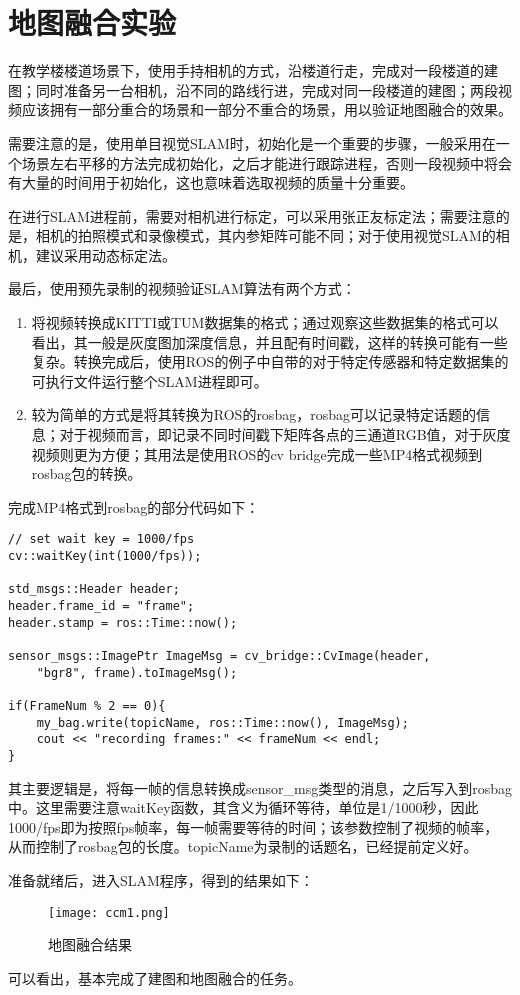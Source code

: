 \section{地图融合实验}

在教学楼楼道场景下，使用手持相机的方式，沿楼道行走，完成对一段楼道的建图；同时准备另一台相机，沿不同的路线行进，完成对同一段楼道的建图；两段视频应该拥有一部分重合的场景和一部分不重合的场景，用以验证地图融合的效果。

需要注意的是，使用单目视觉SLAM时，初始化是一个重要的步骤，一般采用在一个场景左右平移的方法完成初始化，之后才能进行跟踪进程，否则一段视频中将会有大量的时间用于初始化，这也意味着选取视频的质量十分重要。

在进行SLAM进程前，需要对相机进行标定，可以采用张正友标定法；需要注意的是，相机的拍照模式和录像模式，其内参矩阵可能不同；对于使用视觉SLAM的相机，建议采用动态标定法。

最后，使用预先录制的视频验证SLAM算法有两个方式：

\begin{enumerate}
	\item 将视频转换成KITTI或TUM数据集的格式；通过观察这些数据集的格式可以看出，其一般是灰度图加深度信息，并且配有时间戳，这样的转换可能有一些复杂。转换完成后，使用ROS的例子中自带的对于特定传感器和特定数据集的可执行文件运行整个SLAM进程即可。
	\item 较为简单的方式是将其转换为ROS的rosbag，rosbag可以记录特定话题的信息；对于视频而言，即记录不同时间戳下矩阵各点的三通道RGB值，对于灰度视频则更为方便；其用法是使用ROS的cv bridge完成一些MP4格式视频到rosbag包的转换。
\end{enumerate}

完成MP4格式到rosbag的部分代码如下：

\begin{verbatim}
// set wait key = 1000/fps
cv::waitKey(int(1000/fps));

std_msgs::Header header;
header.frame_id = "frame";
header.stamp = ros::Time::now();

sensor_msgs::ImagePtr ImageMsg = cv_bridge::CvImage(header, 
    "bgr8", frame).toImageMsg();

if(FrameNum % 2 == 0){
    my_bag.write(topicName, ros::Time::now(), ImageMsg);
    cout << "recording frames:" << frameNum << endl;
}
\end{verbatim}

其主要逻辑是，将每一帧的信息转换成sensor\_msg类型的消息，之后写入到rosbag中。这里需要注意waitKey函数，其含义为循环等待，单位是1/1000秒，因此1000/fps即为按照fps帧率，每一帧需要等待的时间；该参数控制了视频的帧率，从而控制了rosbag包的长度。topicName为录制的话题名，已经提前定义好。

准备就绪后，进入SLAM程序，得到的结果如下：

\begin{figure}[!ht]
	\centering
	\texttt{[image: ccm1.png]}
	\caption{地图融合结果}
	\label{fig5-1}
\end{figure}

可以看出，基本完成了建图和地图融合的任务。